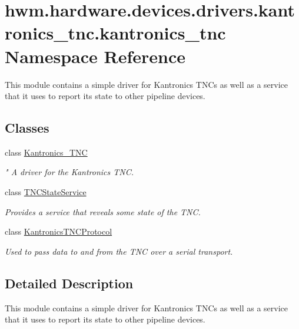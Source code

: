 \hypertarget{namespacehwm_1_1hardware_1_1devices_1_1drivers_1_1kantronics__tnc_1_1kantronics__tnc}{\section{hwm.\-hardware.\-devices.\-drivers.\-kantronics\-\_\-tnc.\-kantronics\-\_\-tnc Namespace Reference}
\label{namespacehwm_1_1hardware_1_1devices_1_1drivers_1_1kantronics__tnc_1_1kantronics__tnc}
}


This module contains a simple driver for Kantronics T\-N\-Cs as well as a service that it uses to report its state to other pipeline devices.  


\subsection*{Classes}
\begin{DoxyCompactItemize}
\item 
class \hyperlink{classhwm_1_1hardware_1_1devices_1_1drivers_1_1kantronics__tnc_1_1kantronics__tnc_1_1_kantronics___t_n_c}{Kantronics\-\_\-\-T\-N\-C}
\begin{DoxyCompactList}\small\item\em " A driver for the Kantronics T\-N\-C. \end{DoxyCompactList}\item 
class \hyperlink{classhwm_1_1hardware_1_1devices_1_1drivers_1_1kantronics__tnc_1_1kantronics__tnc_1_1_t_n_c_state_service}{T\-N\-C\-State\-Service}
\begin{DoxyCompactList}\small\item\em Provides a service that reveals some state of the T\-N\-C. \end{DoxyCompactList}\item 
class \hyperlink{classhwm_1_1hardware_1_1devices_1_1drivers_1_1kantronics__tnc_1_1kantronics__tnc_1_1_kantronics_t_n_c_protocol}{Kantronics\-T\-N\-C\-Protocol}
\begin{DoxyCompactList}\small\item\em Used to pass data to and from the T\-N\-C over a serial transport. \end{DoxyCompactList}\end{DoxyCompactItemize}


\subsection{Detailed Description}
This module contains a simple driver for Kantronics T\-N\-Cs as well as a service that it uses to report its state to other pipeline devices. 
